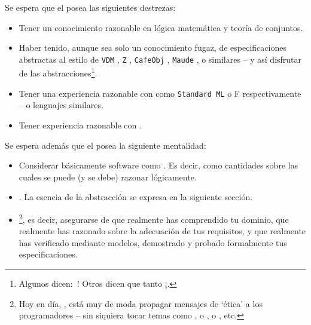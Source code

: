 \begynd
\pind Se espera que el  posea las
      siguientes destrezas:
\afslut
\begin{itemize}
\item Tener un conocimiento razonable en  lógica matemática
  y teoría de conjuntos.
\item Haber tenido, aunque sea solo un conocimiento fugaz, de especificaciones abstractas al estilo de
  \texttt{VDM} \citevdm,
  \texttt{Z} \citez,
  \texttt{CafeObj} \citecafeobj, 
  \texttt{Maude} \cite{maude-primer,maude-manual}, o similares -- y así
  disfrutar de las abstracciones\footnote{Algunos dicen: \,! Otros dicen que tanto ¡.}.
\item Tener una experiencia razonable con  como \texttt{Standard ML} o \textsf{F}
      \cite{MilnerTofte,Harper,MRHansen+HRischel} respectivamente
      \cite{Hansen+Rischel} -- o lenguajes similares.
    \item Tener experiencia razonable con 
      \cite{Hoa78,Hoare85,Hoare85+2004,Roscoe97,Schneider99}.
\end{itemize}
\noindent
\begynd
\pind Se espera además que el  posea
      la siguiente mentalidad:
\afslut
\begin{itemize}
\item Considerar básicamente software como . Es decir, como cantidades sobre las cuales se puede (y se debe) razonar lógicamente.
  \item {}. La esencia de
  la abstracción se expresa en la siguiente sección.

\item {}\footnote{Hoy en día, \todaytime, 
    está muy de moda propagar mensajes de `ética' a los programadores
    -- sin siquiera tocar temas como , o
    ,
    o , etc.}, es decir, asegurarse de que 
    realmente has comprendido tu dominio, que realmente has razonado
    sobre la adecuación de tus requisitos, y que realmente has
    verificado mediante modelos, demostrado y probado formalmente tus
    especificaciones.
\end{itemize}
\label{primer:Abstraction}

